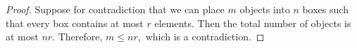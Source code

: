 \begin{proof}
    Suppose for contradiction that we can place $m$ objects into $n$ boxes such that every box contains at most $r$ elements. Then the total number of objects is at most $nr$. Therefore, $m\leq nr,$ which is a contradiction.
\end{proof}